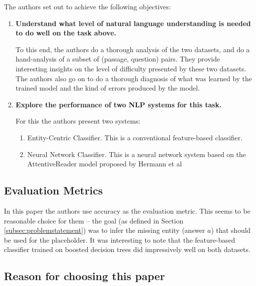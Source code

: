 The authors set out to achieve the following objectives:
\begin{enumerate}
\item \textbf{Understand what level of natural language understanding is needed to do well on the task above.} 

To this end, the authors do a thorough analysis of the two datasets, and do a hand-analysis of a subset of (passage, question) pairs. They provide interesting insights on the level of difficulty presented by these two datasets. The authors also go on to do a thorough diagnosis of what was learned by the trained model and the kind of errors produced by the model.

\item \textbf{Explore the performance of two NLP systems for this task.}

For this the authors present two systems: 
	\begin{enumerate}
	\item Entity-Centric Classifier. This is a conventional feature-based classifier.
	\item Neural Network Classifier. This is a neural network system based on the AttentiveReader model proposed by Hermann et al \cite{hermann2015teaching}
	\end{enumerate}
\end{enumerate}

\subsection{Evaluation Metrics}
\label{subsec:evaluationmetrics}

In this paper the authors use accuracy as the evaluation metric. This seems to be reasonable choice for them -- the goal (as defined in Section \ref{subsec:problemstatement}) was to infer the missing entity (answer $a$) that should be used for the placeholder.  It was interesting to note that the feature-based classifier trained on  boosted decision trees \cite{wu2010adapting} did impressively well on both datasets.

\subsection{Reason for choosing this paper}
\label{subsec:choice}

